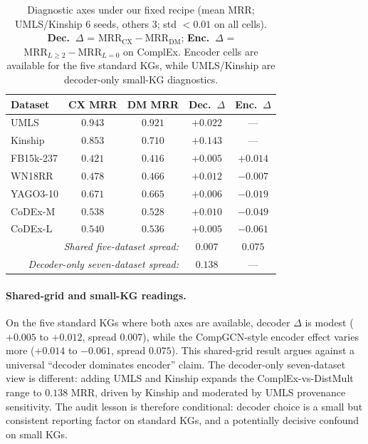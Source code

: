 \documentclass[runningheads]{llncs}
\begin{document}
\begin{table}[!htb]
\centering
\caption{Diagnostic axes under our fixed recipe (mean MRR; UMLS/Kinship 6 seeds, others 3; std $<\!0.01$ on all cells). \textbf{Dec.\ $\Delta$} = $\mathrm{MRR}_{\mathrm{CX}} - \mathrm{MRR}_{\mathrm{DM}}$; \textbf{Enc.\ $\Delta$} = $\mathrm{MRR}_{L \ge 2} - \mathrm{MRR}_{L=0}$ on ComplEx. Encoder cells are available for the five standard KGs, while UMLS/Kinship are decoder-only small-KG diagnostics.}
\label{tab:decoder-diagnostic}
\small
\setlength{\tabcolsep}{4pt}
\begin{tabular}{lcccc}
\toprule
Dataset & CX MRR & DM MRR & \textbf{Dec.\ $\Delta$} & Enc.\ $\Delta$ \\
\midrule
UMLS        & $\mathbf{0.943}$ & $0.921$ & $+0.022$ & --- \\
Kinship     & $\mathbf{0.853}$ & $0.710$ & $\mathbf{+0.143}$ & --- \\
\midrule
FB15k-237   & $\mathbf{0.421}$ & $0.416$ & $+0.005$ & $+0.014$ \\
WN18RR      & $\mathbf{0.478}$ & $0.466$ & $+0.012$ & $-0.007$ \\
YAGO3-10    & $\mathbf{0.671}$ & $0.665$ & $+0.006$ & $-0.019$ \\
CoDEx-M     & $\mathbf{0.538}$ & $0.528$ & $+0.010$ & $-0.049$ \\
CoDEx-L     & $\mathbf{0.540}$ & $0.536$ & $+0.005$ & $-0.061$ \\
\midrule
\multicolumn{3}{r}{\emph{Shared five-dataset spread:}} & $0.007$ & $0.075$ \\
\multicolumn{3}{r}{\emph{Decoder-only seven-dataset spread:}} & $\mathbf{0.138}$ & --- \\
\bottomrule
\end{tabular}
\end{table}

\paragraph{Shared-grid and small-KG readings.}
On the five standard KGs where both axes are available, decoder $\Delta$ is modest ($+0.005$ to $+0.012$, spread $0.007$), while the CompGCN-style encoder effect varies more ($+0.014$ to $-0.061$, spread $0.075$). This shared-grid result argues against a universal ``decoder dominates encoder'' claim. The decoder-only seven-dataset view is different: adding UMLS and Kinship expands the ComplEx-vs-DistMult range to $0.138$ MRR, driven by Kinship and moderated by UMLS provenance sensitivity. The audit lesson is therefore conditional: decoder choice is a small but consistent reporting factor on standard KGs, and a potentially decisive confound on small KGs.
\end{document}
